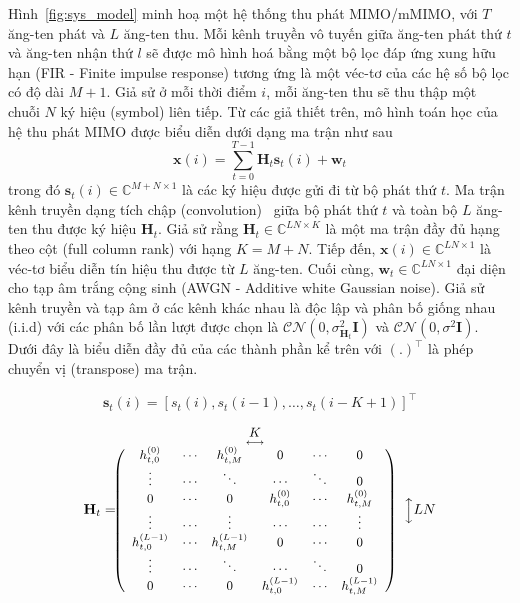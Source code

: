 Hình~\ref{fig:sys_model} minh hoạ một hệ thống thu phát MIMO/mMIMO, với $T$ ăng-ten phát và $L$ ăng-ten thu. Mỗi kênh truyền vô tuyến giữa ăng-ten phát thứ $t$ và ăng-ten nhận thứ $l$ sẽ được mô hình hoá bằng một bộ lọc đáp ứng xung hữu hạn (FIR - Finite impulse response) tương ứng là một véc-tơ của các hệ số bộ lọc có độ dài $M+1$. Giả sử ở mỗi thời điểm $i$, mỗi ăng-ten thu sẽ thu thập một chuỗi $N$ ký hiệu (symbol) liên tiếp. Từ các giả thiết trên, mô hình toán học của hệ thu phát MIMO được biểu diễn dưới dạng ma trận như sau
\begin{equation}
    \mathbf{x}(i) = \sum_{t=0}^{T-1}\mathbf{H}_t \mathbf{s}_t(i) + \mathbf{w}_t
\end{equation}
trong đó $\mathbf{s}_t(i) \in \mathbb{C}^{M+N \times 1}$ là các ký hiệu được gửi đi từ bộ phát thứ $t$. Ma trận kênh truyền dạng tích chập (convolution)~\cite{original} giữa bộ phát thứ $t$ và toàn bộ $L$ ăng-ten thu được ký hiệu $\mathbf{H}_t$. Giả sử rằng $\mathbf{H}_t \in \mathbb{C}^{LN \times K}$ là một ma trận đầy đủ hạng theo cột (full column rank) với hạng $K = M+N$. Tiếp đến, $\mathbf{x}(i) \in \mathbb{C}^{LN \times 1}$ là véc-tơ biểu diễn tín hiệu thu được từ $L$ ăng-ten. Cuối cùng, $\mathbf{w}_t \in \mathbb{C}^{LN \times 1}$ đại diện cho tạp âm trắng cộng sinh (AWGN - Additive white Gaussian noise). Giả sử kênh truyền và tạp âm ở các kênh khác nhau là độc lập và phân bố giống nhau (i.i.d) với các phân bố lần lượt được chọn là $\mathcal{CN}(0, \sigma_{\mathbf{H}_t}^2 \mathbf{I})$ và $\mathcal{CN}(0, \sigma^2 \mathbf{I})$. Dưới đây là biểu diễn đầy đủ của các thành phần kể trên với $(.)^\top$ là phép chuyển vị (transpose) ma trận.

\begin{equation}
    \mathbf{s}_t(i) = [s_t(i), s_t(i-1),\ldots,s_t(i-K+1)]^\top
\end{equation}

\begin{equation}
    \small
    \mathbf{H}_t= \hspace{-0.7cm}
    \begin{array}{cc}
         & \underset{\longleftrightarrow}{K}\\
         & \left(\begin{array}{cccccc}
    h_{t, 0}^{(0)} & \cdots & h_{t, M}^{(0)} & 0 & \cdots & 0 \\
    \vdots & \cdots & \ddots & \cdots & \ddots & 0 \\
    0 & \cdots & 0 & h_{t, 0}^{(0)} & \cdots & h_{t, M}^{(0)} \\
    \vdots & \cdots & \vdots & \cdots & \cdots & \vdots \\
    h_{t, 0}^{(L-1)} & \cdots & h_{t, M}^{(L-1)} & 0 & \cdots & 0 \\
    \vdots & \cdots & \ddots & \cdots & \ddots & 0 \\
    0 & \cdots & 0 & h_{t, 0}^{(L-1)} & \cdots & h_{t, M}^{(L-1)}
    \end{array}
    \right) 
    \end{array}
    \Big\updownarrow LN    
\end{equation}

